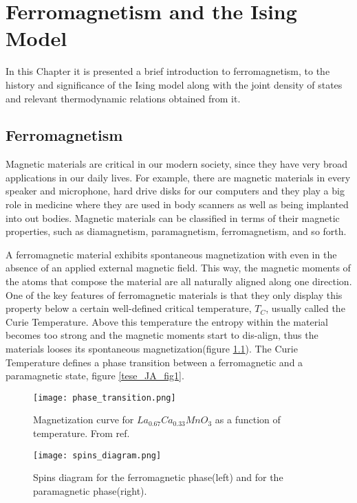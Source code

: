 \chapter{Ferromagnetism and the Ising Model}

In this Chapter it is presented a brief introduction to ferromagnetism, to the history and significance of the Ising model along with the joint density of states and relevant thermodynamic relations obtained from it.

\section{Ferromagnetism}

Magnetic materials are critical in our modern society, since they have very broad applications in our daily lives. For example, there are magnetic materials in every speaker and microphone, hard drive disks for our computers and they play a big role in medicine where they are used in body scanners as well as being implanted into out bodies. Magnetic materials can be classified in terms of their magnetic properties, such as diamagnetism, paramagnetism, ferromagnetism, and so forth\cite{Griffiths}. 

A ferromagnetic material exhibits spontaneous magnetization with even in the absence of an applied external magnetic field. This way, the magnetic moments of the atoms that compose the material are all naturally aligned along one direction\cite{StephenBlundell2001}. One of the key features of ferromagnetic materials is that they only display this property below a certain well-defined critical temperature, $T_C$, usually called the Curie Temperature. Above this temperature the entropy within the material becomes too strong and the magnetic moments start to dis-align, thus the materials looses its spontaneous magnetization(figure \ref{spins_dia}). The Curie Temperature defines a phase transition between a ferromagnetic and a paramagnetic state, figure \ref{tese_JA_fig1}. 

\begin{figure}[h]
	\centering
	\begin{minipage}{.5\textwidth}
		\centering
		\texttt{[image: phase\_transition.png]}
		\caption{Magnetization curve for $La_{0.67}Ca_{0.33}MnO_3$ as a function of temperature. From ref. \cite{ThesisJA}}
		\label{tese_JA_fig1}
	\end{minipage}%
	\begin{minipage}{.5\textwidth}
		\centering
		\texttt{[image: spins\_diagram.png]}
		\caption{Spins diagram for the ferromagnetic phase(left) and for the paramagnetic phase(right).}
		\label{spins_dia}
	\end{minipage}
\end{figure}

